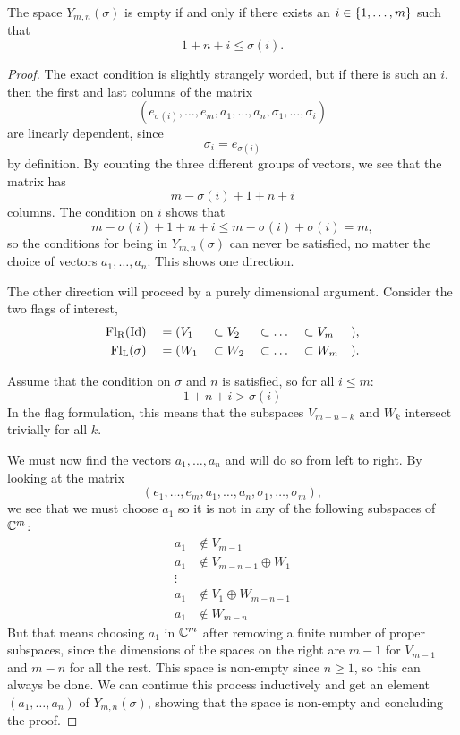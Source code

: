 \begin{theorem}
  \label{thm:ikke-tom}
  The space $Y_{m,n}(\sigma)$ is empty if and only if there exists an
  $i \in \left\{ 1,\dots,m \right\}$ such that
  \[ 1 + n + i \leq \sigma(i). \]
\end{theorem}
\begin{proof}
  The exact condition is slightly strangely worded, but if there is
  such an $i$, then the first and last columns of the matrix
  \[ (e_{\sigma(i)},\dots,e_m,a_1,\dots,a_n,\sigma_1,\dots,\sigma_i) \]
  are linearly dependent, since
  \[ \sigma_i = e_{\sigma(i)} \]
  by definition. By counting the three different groups of vectors, we
  see that the matrix has
  \[ m - \sigma(i) + 1 + n + i \]
  columns. The condition on $i$ shows that
  \[ m - \sigma(i) + 1 + n + i \leq m - \sigma(i) + \sigma(i) = m, \]
  so the conditions for being in $Y_{m,n}(\sigma)$ can never be
  satisfied, no matter the choice of vectors $a_1,\dots,a_n$. This
  shows one direction.

  The other direction
  will proceed by a purely dimensional argument. Consider the two
  flags of interest,
  \begin{alignat*}{6}
    \mathrm{Fl_R}(\operatorname{Id}) &&\;= (&V_1 &&\subset V_2 &&\subset \dots
    &&\subset V_m&&), \\
    \mathrm{Fl_L}(\sigma) &&\;= (&W_1 &&\subset W_2 &&\subset \dots
    &&\subset  W_m&&).
  \end{alignat*}

  Assume that the condition on $\sigma$ and $n$ is satisfied, so for
  all $i \leq m$:
  \[ 1 + n + i > \sigma(i) \]
  In the flag formulation, this means that the subspaces $V_{m-n-k}$
  and $W_k$ intersect trivially for all $k$.

  We must now find the vectors $a_1,\dots,a_n$ and will do so from
  left to right. By looking at the matrix
  \[ \left( e_1, \dots, e_m, a_1, \dots, a_n, \sigma_1, \dots,
    \sigma_m \right), \]
  we see that we must choose $a_1$ so it is not in any of the
  following subspaces of $\mathbb{C}^m$:
  \begin{align*}
    a_1 &\not\in V_{m-1} \\
    a_1 &\not\in V_{m-n-1} \oplus W_1 \\
    \vdots & \\
    a_1 &\not\in V_1\oplus W_{m-n-1} \\
    a_1 &\not\in W_{m-n}
  \end{align*}
  But that means choosing $a_1$ in $\mathbb{C}^m$ after removing a
  finite number of proper subspaces, since the dimensions of the
  spaces on the right are $m-1$ for $V_{m-1}$ and $m-n$ for
  all the rest. This space is non-empty since $n\geq 1$, so this can
  always be done. We can continue this process inductively and get an
  element $(a_1,\dots,a_n)$ of $Y_{m,n}(\sigma)$, showing that the
  space is non-empty and concluding the proof.
\end{proof}
